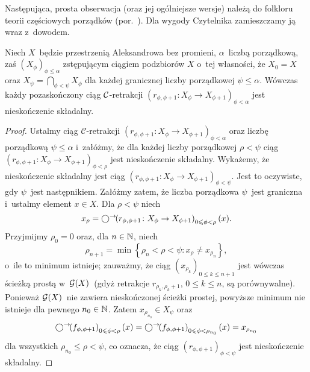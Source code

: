Następująca, prosta obserwacja (oraz jej ogólniejsze wersje) należą do folkloru teorii częściowych porządków (por.~\cite{Schroder99,Schroder00}). Dla wygody Czytelnika zamieszczamy ją wraz z~dowodem.

\begin{lem}\label{nsk_skladalnosc_w_prz_bez_promieni}
Niech $X$~będzie przestrzenią Aleksandrowa bez promieni, $\alpha$~liczbą porządkową, zaś $\left(X_\phi\right)_{\phi\leq\alpha}$ zstępującym ciągiem podzbiorów $X$ o~tej własności, że $X_0=X$ oraz $X_{\psi}=\bigcap_{\phi<\psi}X_{\phi}$ dla każdej granicznej liczby porządkowej $\psi\leq\alpha$. Wówczas każdy pozaskończony ciąg $\mathcal{C}$-retrakcji $\left(r_{\phi,\phi+1}\colon X_\phi\to X_{\phi+1}\right)_{\phi<\alpha}$ jest nieskończenie składalny.
\end{lem}
\begin{proof}
Ustalmy ciąg $\mathcal{C}$-retrakcji $\left(r_{\phi,\phi+1}\colon X_\phi\to X_{\phi+1}\right)_{\phi<\alpha}$ oraz liczbę porządkową $\psi\leq \alpha$ i~załóżmy, że dla każdej liczby porządkowej $\rho<\psi$ ciąg $\left(r_{\phi,\phi+1}\colon X_\phi\to X_{\phi+1}\right)_{\phi<\rho}$ jest nieskończenie składalny. Wykażemy, że nieskończenie składalny jest ciąg $\left(r_{\phi,\phi+1}\colon X_\phi\to X_{\phi+1}\right)_{\phi<\psi}$. Jest to oczywiste, gdy $\psi$~jest następnikiem. Załóżmy zatem, że liczba porządkowa $\psi$~jest graniczna i~ustalmy element $x\in X$. Dla $\rho<\psi$ niech \[x_\rho=\bigcirc^\rightarrow\!\!\left(r_{\phi,\phi+1}\colon X_\phi\to X_{\phi+1}\right)_{0\leqslant \phi< \rho}(x).\] Przyjmijmy $\rho_0=0$ oraz, dla $n\in\mathbb{N}$, niech \[\rho_{n+1}=\min\left\{\rho_n<\rho<\psi:x_{\rho}\not=x_{\rho_n}\right\},\] o~ile to minimum istnieje; zauważmy, że ciąg $\left(x_{\rho_k}\right)_{0\leq k\leq n+1}$ jest wówczas ścieżką prostą w~$\mathcal{G}(X)$~(gdyż retrakcje $r_{\rho_k,\rho_{k}+1}$, $0\leq k\leq n$, są porównywalne). Ponieważ $\mathcal{G}(X)$~nie zawiera nieskończonej ścieżki prostej, powyższe minimum nie istnieje dla pewnego $n_0\in \mathbb{N}$. Zatem $x_{\rho_{n_0}}\in X_\psi$ oraz \[\bigcirc^\rightarrow\!\!\left(f_{\phi,\phi+1}\right)_{0\leqslant\phi<\rho}(x)=\bigcirc^\rightarrow\!\!\left(f_{\phi,\phi+1}\right)_{0\leqslant\phi<\rho_{n_0}}(x)=x_{\rho_{n_0}}\] dla wszystkich $\rho_{n_0}\leq \rho<\psi$, co oznacza, że ciąg $\left(r_{\phi,\phi+1}\right)_{\phi<\psi}$ jest nieskończenie składalny.
\end{proof}

\begin{comment}
\begin{lem}\label{lem-retrakt_rozbieralnego_jest_rozbieralny}
Niech $X$ będzie łańcuchowo zupełną przestrzenią Aleksandrowa, zaś $r\colon X\to r(X)$ zachowującą porządek retrakcją. Jeżeli $X\dism *$, to $r(X)\dism *$.
\end{lem}
\begin{proof}
???
\end{proof}
\end{comment}


